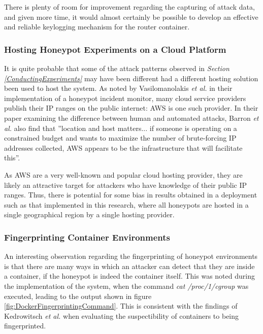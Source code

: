 There is plenty of room for improvement regarding the capturing of attack data, and given more time, it would almost certainly be possible to develop an effective and reliable keylogging mechanism for the router container. 

\subsubsection{Hosting Honeypot Experiments on a Cloud Platform}
It is quite probable that some of the attack patterns observed in \textit{Section \ref{ConductingExperiments}} may have been different had a different hosting solution been used to host the system. As noted by Vasilomanolakis \textit{et al.} in their implementation of a honeypot incident monitor, \cite{Vasilomanolakis} many cloud service providers publish their IP ranges on the public internet: AWS is one such provider. \cite{AWS_PublicIPRanges} In their paper examining the difference between human and automated attacks, Barron \textit{et al.}  also find that ''location and host matters... if someone is operating on a constrained budget and wants to maximize the number of brute-forcing IP addresses collected, AWS appears to be the infrastructure that will facilitate this''. \cite{PickyAttackers2017}

As AWS are a very well-known and popular cloud hosting provider, they are likely an attractive target for attackers who have knowledge of their public IP ranges. Thus, there is potential for some bias in results obtained in a deployment such as that implemented in this research, where all honeypots are hosted in a single geographical region by a single hosting provider. 
 


\subsubsection{Fingerprinting Container Environments}
An interesting observation regarding the fingerprinting of honeypot environments is that there are many ways in which an attacker can detect that they are inside a container, if the honeypot is indeed the container itself. This was noted during the implementation of the system, when the command \textit{cat /proc/1/cgroup} was executed, leading to the output shown in figure \ref{fig:DockerFingerprintingCommand}. This is consistent with the findings of Kedrowitsch \textit{et al.} when evaluating the suspectibility of containers to being fingerprinted. \cite{LXCsForDeceptiveHoneypots2017}

